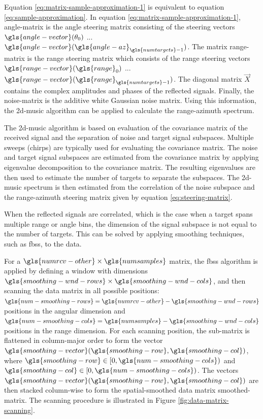 Equation \ref{eq:matrix-sample-approximation-1} is equivalent to equation \ref{eq:sample-approximation}.
In equation \ref{eq:matrix-sample-approximation-1}, \gls{angle-matrix} is the angle steering matrix consisting of the steering vectors $\gls{angle-vector}(\theta_0)$ ... $\gls{angle-vector}(\gls{angle-az}_{\gls{numtargets}-1})$.
The matrix \gls{range-matrix} is the range steering matrix which consists of the range steering vectors $\gls{range-vector}(\gls{range}_0)$ ... $\gls{range-vector}(\gls{range}_{\gls{numtargets}-1})$.
The diagonal matrix $\vec{X}$ contains the complex amplitudes and phases of the reflected signals.
Finally, the \gls{noise-matrix} is the additive white Gaussian noise matrix.
Using this information, the \gls{2d-music} algorithm can be applied to calculate the range-azimuth spectrum.

The \gls{2d-music} algorithm is based on evaluation of the covariance matrix of the received signal and the separation of noise and target signal subspaces.
Multiple sweeps (chirps) are typically used for evaluating the covariance matrix.
The noise and target signal subspaces are estimated from the covariance matrix by applying eigenvalue decomposition to the covariance matrix.
The resulting eigenvalues are then used to estimate the number of targets to separate the subspaces.
The \gls{2d-music} spectrum is then estimated from the correlation of the noise subspace
and the range-azimuth steering matrix given by equation \ref{eq:steering-matrix}.~\cite{2d-music-van-rossum}

When the reflected signals are correlated, which is the case when a target spans multiple range or angle bins,
the dimension of the signal subspace is not equal to the number of targets.
This can be solved by applying smoothing techniques, such as \gls{fbss}, to the data.~\cite{2d-music-van-rossum, fbss-techniques}

For a $\gls{numrcv-other} \times \gls{numsamples}$ matrix, the \gls{fbss} algorithm is applied by defining a window with dimensions $\gls{smoothing-wnd-rows} \times \gls{smoothing-wnd-cols}$,
and then scanning the data matrix in all possible positions: 
$\gls{num-smoothing-rows} = \gls{numrcv-other} - \gls{smoothing-wnd-rows}$ positions in the angular dimension and $\gls{num-smoothing-cols} = \gls{numsamples} - \gls{smoothing-wnd-cols}$ positions in the range dimension.
For each scanning position, the sub-matrix is flattened in column-major order to form the vector $\gls{smoothing-vector}(\gls{smoothing-row}, \gls{smoothing-col})$,
where $\gls{smoothing-row} \in \left[ 0, \gls{num-smoothing-cols} \right)$ and $\gls{smoothing-col} \in \left[ 0, \gls{num-smoothing-cols} \right) $.
The vectors $\gls{smoothing-vector}(\gls{smoothing-row}, \gls{smoothing-col})$ are then stacked column-wise to form the spatial-smoothed data matrix \gls{smoothed-matrix}.
The scanning procedure is illustrated in Figure \ref{fig:data-matrix-scanning}.~\cite{2d-music-van-rossum, music-based-algo}

